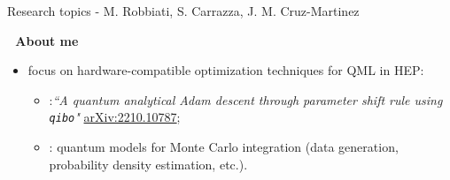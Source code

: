 \documentclass[9pt, xcolor={svgnames}, hyperref={colorlinks,linkcolor=black, citecolor=teal, urlcolor=teal}]{beamer}
\begin{document}
\begin{frame}{\normalsize Research topics - M. Robbiati, S. Carrazza, J. M. Cruz-Martinez}
    \begin{tcolorbox}[colback=purple!20,boxrule=1pt,arc=.8em,boxsep=-1mm]
    \faUser\,\, \textbf{About me}
    \begin{itemize}
        \item[\faCrosshairs] focus on hardware-compatible optimization techniques for QML in HEP:
        \begin{itemize}
            \item[\faEdit]:\textit{``A quantum analytical Adam descent through parameter shift rule using \texttt{qibo}" }\href{https://arxiv.org/abs/2210.10787}{arXiv:2210.10787};
            \item[\faCogs]: quantum models for Monte Carlo integration (data generation, probability density estimation, etc.).
        \end{itemize}
    \end{itemize}
    \end{tcolorbox}
\end{frame} 
\end{document}
